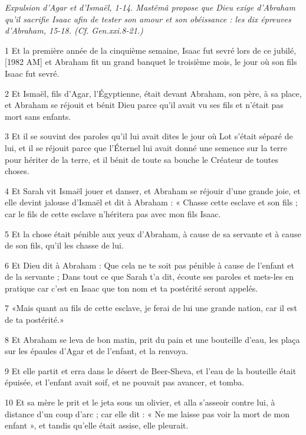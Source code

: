 
\par \textit{Expulsion d'Agar et d'Ismaël, 1-14. Mastêmâ propose que Dieu exige d'Abraham qu'il sacrifie Isaac afin de tester son amour et son obéissance : les dix épreuves d'Abraham, 15-18. (Cf. Gen.xxi.8-21.)}

\par 1 Et la première année de la cinquième semaine, Isaac fut sevré lors de ce jubilé, [1982 AM] et Abraham fit un grand banquet le troisième mois, le jour où son fils Isaac fut sevré.
\par 2 Et Ismaël, fils d'Agar, l'Égyptienne, était devant Abraham, son père, à sa place, et Abraham se réjouit et bénit Dieu parce qu'il avait vu ses fils et n'était pas mort sans enfants.
\par 3 Et il se souvint des paroles qu'il lui avait dites le jour où Lot s'était séparé de lui, et il se réjouit parce que l'Éternel lui avait donné une semence sur la terre pour hériter de la terre, et il bénit de toute sa bouche le Créateur de toutes choses.
\par 4 Et Sarah vit Ismaël jouer et danser, et Abraham se réjouir d'une grande joie, et elle devint jalouse d'Ismaël et dit à Abraham : « Chasse cette esclave et son fils ; car le fils de cette esclave n'héritera pas avec mon fils Isaac.
\par 5 Et la chose était pénible aux yeux d'Abraham, à cause de sa servante et à cause de son fils, qu'il les chasse de lui.
\par 6 Et Dieu dit à Abraham : Que cela ne te soit pas pénible à cause de l'enfant et de la servante ; Dans tout ce que Sarah t'a dit, écoute ses paroles et mets-les en pratique car c'est en Isaac que ton nom et ta postérité seront appelés.
\par 7 «Mais quant au fils de cette esclave, je ferai de lui une grande nation, car il est de ta postérité.»
\par 8 Et Abraham se leva de bon matin, prit du pain et une bouteille d'eau, les plaça sur les épaules d'Agar et de l'enfant, et la renvoya.
\par 9 Et elle partit et erra dans le désert de Beer-Sheva, et l'eau de la bouteille était épuisée, et l'enfant avait soif, et ne pouvait pas avancer, et tomba.
\par 10 Et sa mère le prit et le jeta sous un olivier, et alla s'asseoir contre lui, à distance d'un coup d'arc ; car elle dit : « Ne me laisse pas voir la mort de mon enfant », et tandis qu'elle était assise, elle pleurait.
